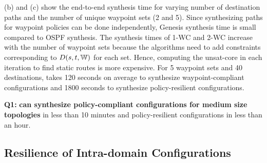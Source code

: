 (b) and (c) show the end-to-end synthesis
 time for varying number of destination paths and the 
 number of unique waypoint sets (2 and 5). 
 Since synthesizing paths
 for waypoint policies can be done independently,
Genesis synthesis time is small compared to OSPF synthesis. 
The synthesis times of 1-WC and 2-WC 
increase with the number of waypoint sets because
the algorithms 
need to add constraints corresponding to $D(s,t,\mathbb{W})$ 
for each set. Hence, computing the unsat-core in each
iteration to find static routes is more expensive. 
For 5 waypoint sets and 40 destinations, \name takes 120 
seconds on average to synthesize waypoint-compliant configurations
and 1800 seconds to synthesize policy-resilient configurations.

\textbf{Q1:} \textbf{\name can synthesize policy-compliant configurations for medium size topologies} in less than 10 minutes and policy-resilient 
configurations in  less than an hour.



\subsection{Resilience of Intra-domain Configurations} \label{sec:reseval}



